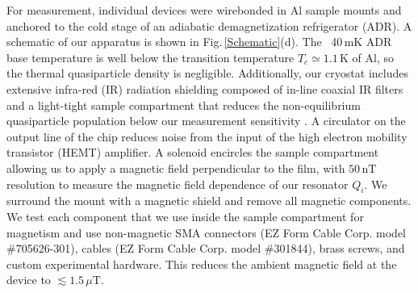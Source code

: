 For measurement, individual devices were wirebonded in Al sample mounts and anchored to the cold stage of an adiabatic demagnetization refrigerator (ADR).
A schematic of our apparatus is shown in Fig.\,\ref{Schematic}(d).  The ~40\,mK ADR base temperature is well below the transition temperature $T_c \simeq 1.1\,\textrm{K}$ of Al, so the thermal quasiparticle density is negligible.
Additionally, our cryostat includes extensive infra-red (IR) radiation shielding composed of in-line coaxial IR filters and a light-tight sample compartment that reduces the non-equilibrium quasiparticle population below our measurement sensitivity \cite{barends2011}.
A circulator on the output line of the chip reduces noise from the input of the high electron mobility transistor (HEMT) amplifier. A solenoid encircles the sample compartment allowing us to apply a magnetic field perpendicular to the film, with $50\,\textrm{nT}$ resolution to measure the magnetic field dependence of our resonator $Q_i$.  We surround the mount with a magnetic shield and remove all magnetic components.  We test each component that we use inside the sample compartment for magnetism and use non-magnetic SMA connectors (EZ Form Cable Corp. model \#705626-301), cables (EZ Form Cable Corp. model \#301844), brass screws, and custom experimental hardware.  This reduces the ambient magnetic field at the device to $\lesssim 1.5\,\mu\textrm{T}$.


